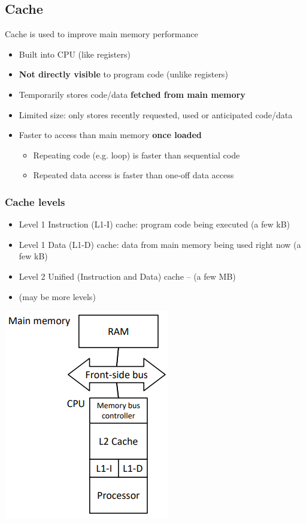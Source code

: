 \documentclass{article}
\begin{document}
\subsection{Cache}
\begin{flushleft}
Cache is used to improve main memory performance
\begin{itemize}
  \item Built into CPU (like registers)
  \item \textbf{Not directly visible} to program code (unlike registers)
  \item Temporarily stores code/data \textbf{fetched from main memory}
  \item Limited size: only stores recently requested, used or anticipated code/data
  \item Faster to access than main memory \textbf{once loaded}
  \begin{itemize}
    \item Repeating code (e.g. loop) is faster than sequential code 
    \item Repeated data access is faster than one-off data access
  \end{itemize}
\end{itemize}
\end{flushleft}

\subsubsection{Cache levels}

\begin{itemize}
  \item Level 1 Instruction (L1-I) cache: program code being executed (a few kB)
  \item Level 1 Data (L1-D) cache: data from main memory being used right now (a few kB)
  \item Level 2 Unified (Instruction and Data) cache – (a few MB)
  \item (may be more levels)
\end{itemize}

\begin{multicols}{2}

\includegraphics[scale=0.5]{cache_levels.png}

\end{multicols}
\end{document}
